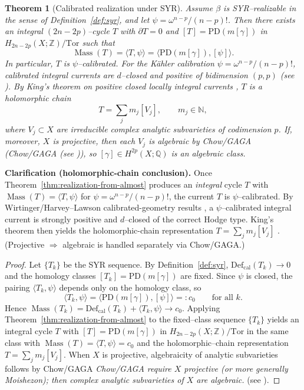 \documentclass[11pt]{article}
\newcommand{\REV}[1]{\textcolor{blue}{#1}}
\numberwithin{equation}{section}  %
\theoremstyle{plain}
\newtheorem{theorem}{Theorem}[section]
\theoremstyle{definition}
\theoremstyle{remark}
\newcommand{\Z}{\mathbb{Z}}
\newcommand{\Q}{\mathbb{Q}}
\DeclareMathOperator{\Mass}{Mass}
\newcommand{\Def}{\mathrm{Def}}
\begin{document}
\begin{theorem}[Calibrated realization under SYR]\label{thm:syr}
\label{prop:realizability-stationary}
Assume $\beta$ is SYR--realizable in the sense of Definition~\ref{def:syr}, and let $\psi=\omega^{n-p}/(n-p)!$.
Then there exists an integral $(2n-2p)$--cycle $T$ with $\partial T=0$ and $[T]=\mathrm{PD}(m[\gamma])$ in $H_{2n-2p}(X;\Z)/\mathrm{Tor}$ such that
\[
\Mass(T)=\langle T,\psi\rangle=\bigl\langle \mathrm{PD}(m[\gamma]),[\psi]\bigr\rangle.
\]
In particular, $T$ is $\psi$--calibrated.  For the K\"ahler calibration $\psi=\omega^{n-p}/(n-p)!$, calibrated integral currents are $d$--closed and positive of bidimension $(p,p)$ (see \cite{HL82}).  By King's theorem on positive closed locally integral currents \cite{King71}, $T$ is a holomorphic chain
\[
T=\sum_j m_j[V_j],
\qquad m_j\in\mathbb{N},
\]
where $V_j\subset X$ are irreducible complex analytic subvarieties of codimension $p$.  If, moreover, $X$ is projective, then each $V_j$ is algebraic by Chow/GAGA (Chow/GAGA (see \REV{\cite{Hartshorne77,GH78,Serre56}})), so $[\gamma]\in H^{2p}(X;\Q)$ is an algebraic class.
\end{theorem}



\noindent\textbf{Clarification (holomorphic-chain conclusion).}
Once Theorem~\ref{thm:realization-from-almost} produces an \emph{integral} cycle $T$ with
$\Mass(T)=\langle T,\psi\rangle$ for $\psi=\omega^{n-p}/(n-p)!$, the current $T$ is $\psi$--calibrated.
By Wirtinger/Harvey--Lawson calibrated-geometry results \cite{HL82}, a $\psi$--calibrated integral current is strongly positive and
$d$--closed of the correct Hodge type. King's theorem then yields the holomorphic-chain representation
$T=\sum_j m_j[V_j]$ \cite{King71}. (Projective $\Rightarrow$ algebraic is handled separately via Chow/GAGA.)

\begin{proof}
Let $\{T_k\}$ be the SYR sequence.
By Definition~\ref{def:syr}, $\Def_{\mathrm{cal}}(T_k)\to 0$ and the homology classes $[T_k]=\mathrm{PD}(m[\gamma])$ are fixed.
Since $\psi$ is closed, the pairing $\langle T_k,\psi\rangle$ depends only on the homology class, so
\[
\langle T_k,\psi\rangle=\bigl\langle \mathrm{PD}(m[\gamma]),[\psi]\bigr\rangle=:c_0
\qquad\text{for all }k.
\]
Hence $\Mass(T_k)=\Def_{\mathrm{cal}}(T_k)+\langle T_k,\psi\rangle\to c_0$.
Applying Theorem~\ref{thm:realization-from-almost} to the fixed--class sequence $\{T_k\}$ yields an integral cycle $T$ with $[T]=\mathrm{PD}(m[\gamma])$ in $H_{2n-2p}(X;\Z)/\mathrm{Tor}$
in the same class with $\Mass(T)=\langle T,\psi\rangle=c_0$ and the holomorphic--chain representation
\(T=\sum_j m_j[V_j]\).
When $X$ is projective, algebraicity of analytic subvarieties follows by Chow/GAGA
\emph{Chow/GAGA require $X$ projective (or more generally Moishezon); then complex analytic subvarieties of $X$ are algebraic.}
 (see \REV{\cite{Hartshorne77,GH78,Serre56}}).
\end{proof}
\end{document}
